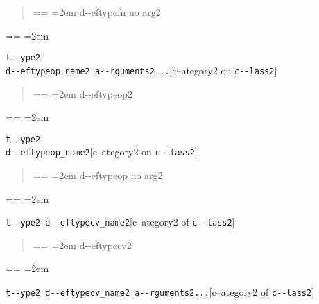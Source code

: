 \documentclass{book}
\makeatletter
\newenvironment{GNUTexinfopreformatted}{%
  \par\obeylines\obeyspaces\frenchspacing
  \parskip=\z@\parindent=\z@}{}
\makeatother
\begin{document}
%
\begin{quote}
\unskip{\parskip=0pt\noindent}%
\begin{GNUTexinfopreformatted}
\leftskip=2em\relax\ttfamily%
d{-}{-}eftypefn no arg2
\end{GNUTexinfopreformatted}
\end{quote}
\begin{GNUTexinfopreformatted}
\leftskip=2em\relax\ttfamily%

\end{GNUTexinfopreformatted}
\noindent\texttt{t{-}{-}ype2\leavevmode{}\\d{-}{-}eftypeop\_name2 a{-}{-}rguments2...}\hfill[c--ategory2 on \texttt{c{-}{-}lass2}]

%
\begin{quote}
\unskip{\parskip=0pt\noindent}%
\begin{GNUTexinfopreformatted}
\leftskip=2em\relax\ttfamily%
d{-}{-}eftypeop2
\end{GNUTexinfopreformatted}
\end{quote}
\begin{GNUTexinfopreformatted}
\leftskip=2em\relax\ttfamily%

\end{GNUTexinfopreformatted}
\noindent\texttt{t{-}{-}ype2\leavevmode{}\\d{-}{-}eftypeop\_name2}\hfill[c--ategory2 on \texttt{c{-}{-}lass2}]

%
\begin{quote}
\unskip{\parskip=0pt\noindent}%
\begin{GNUTexinfopreformatted}
\leftskip=2em\relax\ttfamily%
d{-}{-}eftypeop no arg2
\end{GNUTexinfopreformatted}
\end{quote}
\begin{GNUTexinfopreformatted}
\leftskip=2em\relax\ttfamily%

\end{GNUTexinfopreformatted}
\noindent\texttt{t{-}{-}ype2 d{-}{-}eftypecv\_name2}\hfill[c--ategory2 of \texttt{c{-}{-}lass2}]

%
\begin{quote}
\unskip{\parskip=0pt\noindent}%
\begin{GNUTexinfopreformatted}
\leftskip=2em\relax\ttfamily%
d{-}{-}eftypecv2
\end{GNUTexinfopreformatted}
\end{quote}
\begin{GNUTexinfopreformatted}
\leftskip=2em\relax\ttfamily%

\end{GNUTexinfopreformatted}
\noindent\texttt{t{-}{-}ype2 d{-}{-}eftypecv\_name2 a{-}{-}rguments2...}\hfill[c--ategory2 of \texttt{c{-}{-}lass2}]
\end{document}
